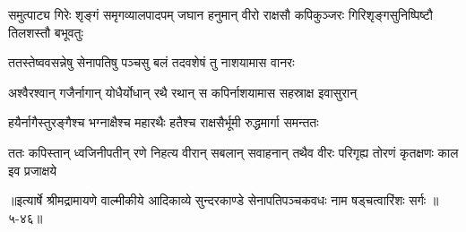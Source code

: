 \threelineshloka
{समुत्पाट्य गिरेः शृङ्गं समृगव्यालपादपम्}
{जघान हनुमान् वीरो राक्षसौ कपिकुञ्जरः}
{गिरिशृङ्गसुनिष्पिष्टौ तिलशस्तौ बभूवतुः} %

\twolineshloka
{ततस्तेष्ववसन्नेषु सेनापतिषु पञ्चसु}
{बलं तदवशेषं तु नाशयामास वानरः} %

\twolineshloka
{अश्वैरश्वान् गजैर्नागान् योधैर्योधान् रथै रथान्}
{स कपिर्नाशयामास सहस्राक्ष इवासुरान्} %

\twolineshloka
{हयैर्नागैस्तुरङ्गैश्च भग्नाक्षैश्च महारथैः}
{हतैश्च राक्षसैर्भूमी रुद्धमार्गा समन्ततः} %

\twolineshloka
{ततः कपिस्तान् ध्वजिनीपतीन् रणे निहत्य वीरान् सबलान् सवाहनान्}
{तथैव वीरः परिगृह्य तोरणं कृतक्षणः काल इव प्रजाक्षये} %


॥इत्यार्षे श्रीमद्रामायणे वाल्मीकीये आदिकाव्ये सुन्दरकाण्डे सेनापतिपञ्चकवधः नाम षड्चत्वारिंशः सर्गः ॥५-४६॥
